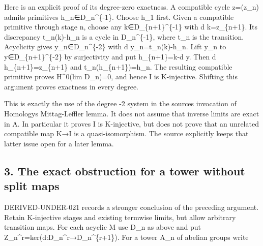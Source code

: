Here is an explicit proof of its degree-zero exactness. A compatible cycle z\allowbreak{}=(z\_\allowbreak{}n)\allowbreak{} admits primitives h\_\allowbreak{}n\allowbreak{}∈D\_\allowbreak{}n\textasciicircum{}\{-1\}. Choose h\_\allowbreak{}1 first. Given a compatible primitive through stage n,\allowbreak{} choose any k\allowbreak{}∈D\_\allowbreak{}\{n\allowbreak{}+1\}\textasciicircum{}\{-1\} with d k\allowbreak{}=z\_\allowbreak{}\{n\allowbreak{}+1\}. Its discrepancy t\_\allowbreak{}n(k)\allowbreak{}-h\_\allowbreak{}n is a cycle in D\_\allowbreak{}n\textasciicircum{}\{-1\},\allowbreak{} where t\_\allowbreak{}n is the transition. Acyclicity gives y\_\allowbreak{}n\allowbreak{}∈D\_\allowbreak{}n\textasciicircum{}\{-2\} with d y\_\allowbreak{}n\allowbreak{}=t\_\allowbreak{}n(k)\allowbreak{}-h\_\allowbreak{}n. Lift y\_\allowbreak{}n to y\allowbreak{}∈D\_\allowbreak{}\{n\allowbreak{}+1\}\textasciicircum{}\{-2\} by surjectivity and put h\_\allowbreak{}\{n\allowbreak{}+1\}\allowbreak{}=k-d y. Then d h\_\allowbreak{}\{n\allowbreak{}+1\}\allowbreak{}=z\_\allowbreak{}\{n\allowbreak{}+1\} and t\_\allowbreak{}n(h\_\allowbreak{}\{n\allowbreak{}+1\})\allowbreak{}\allowbreak{}=h\_\allowbreak{}n. The resulting compatible primitive proves H\^{}0(lim D\_\allowbreak{}n)\allowbreak{}\allowbreak{}=0,\allowbreak{} and hence I is K-injective. Shifting this argument proves exactness in every degree.

This is exactly the use of the degree -2 system in the source\textquotesingle s invocation of Homology\textquotesingle s Mittag-Leffler lemma. It does not assume that inverse limits are exact in A. In particular it proves I is K-injective,\allowbreak{} but does not prove that an unrelated compatible map K\allowbreak{}→I is a quasi-isomorphism. The source explicitly keeps that latter issue open for a later lemma.

\subsection{3. The exact obstruction for a tower without split maps}\label{proofs-9746-10132-the-exact-obstruction-for-a-tower-without-split-maps}

DERIVED-UNDER-021 records a stronger conclusion of the preceding argument. Retain K-injective stages and existing termwise limits,\allowbreak{} but allow arbitrary transition maps. For each acyclic M use D\_\allowbreak{}n as above and put Z\_\allowbreak{}n\textasciicircum{}r\allowbreak{}=ker(d:\allowbreak{}D\_\allowbreak{}n\textasciicircum{}r\allowbreak{}→D\_\allowbreak{}n\textasciicircum{}\{r\allowbreak{}+1\})\allowbreak{}. For a tower A\_\allowbreak{}n of abelian groups write

